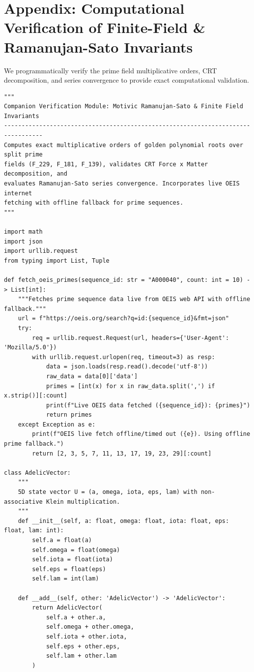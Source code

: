\section*{Appendix: Computational Verification of Finite-Field & Ramanujan-Sato Invariants}
We programmatically verify the prime field multiplicative orders, CRT decomposition, and series convergence to provide exact computational validation.

\begin{verbatim}
"""
Companion Verification Module: Motivic Ramanujan-Sato & Finite Field Invariants
---------------------------------------------------------------------------------
Computes exact multiplicative orders of golden polynomial roots over split prime
fields (F_229, F_181, F_139), validates CRT Force x Matter decomposition, and
evaluates Ramanujan-Sato series convergence. Incorporates live OEIS internet
fetching with offline fallback for prime sequences.
"""

import math
import json
import urllib.request
from typing import List, Tuple

def fetch_oeis_primes(sequence_id: str = "A000040", count: int = 10) -> List[int]:
    """Fetches prime sequence data live from OEIS web API with offline fallback."""
    url = f"https://oeis.org/search?q=id:{sequence_id}&fmt=json"
    try:
        req = urllib.request.Request(url, headers={'User-Agent': 'Mozilla/5.0'})
        with urllib.request.urlopen(req, timeout=3) as resp:
            data = json.loads(resp.read().decode('utf-8'))
            raw_data = data[0]['data']
            primes = [int(x) for x in raw_data.split(',') if x.strip()][:count]
            print(f"Live OEIS data fetched ({sequence_id}): {primes}")
            return primes
    except Exception as e:
        print(f"OEIS live fetch offline/timed out ({e}). Using offline prime fallback.")
        return [2, 3, 5, 7, 11, 13, 17, 19, 23, 29][:count]

class AdelicVector:
    """
    5D state vector U = (a, omega, iota, eps, lam) with non-associative Klein multiplication.
    """
    def __init__(self, a: float, omega: float, iota: float, eps: float, lam: int):
        self.a = float(a)
        self.omega = float(omega)
        self.iota = float(iota)
        self.eps = float(eps)
        self.lam = int(lam)

    def __add__(self, other: 'AdelicVector') -> 'AdelicVector':
        return AdelicVector(
            self.a + other.a,
            self.omega + other.omega,
            self.iota + other.iota,
            self.eps + other.eps,
            self.lam + other.lam
        )


\end{verbatim}
